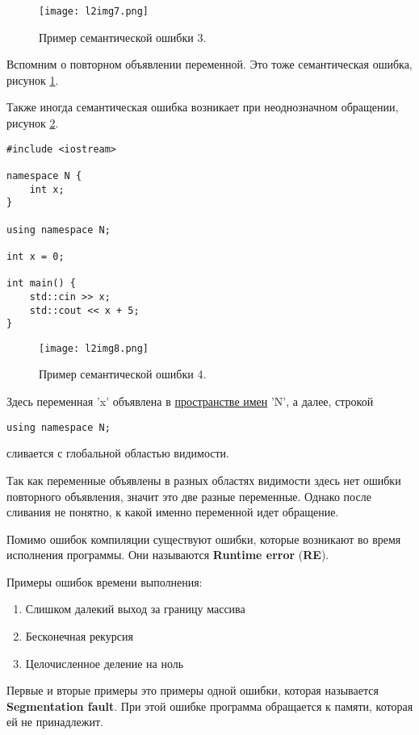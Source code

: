 \begin{figure}[h]
    \centering
    \texttt{[image: l2img7.png]}
    \caption{Пример семантической ошибки 3.}
    \label{l2img7}
\end{figure}

Вспомним о повторном объявлении переменной. Это тоже семантическая ошибка, рисунок \ref{l2img7}.

Также иногда семантическая ошибка возникает при неоднозначном обращении, рисунок \ref{l2img8}.

\begin{verbatim}
#include <iostream>

namespace N {
    int x;
}

using namespace N;

int x = 0;

int main() {
    std::cin >> x;
    std::cout << x + 5;
}
\end{verbatim}

\begin{figure}[h]
    \centering
    \texttt{[image: l2img8.png]}
    \caption{Пример семантической ошибки 4.}
    \label{l2img8}
\end{figure}

Здесь переменная 'x' объявлена в \underline{пространстве имен} 'N', а далее, строкой

\begin{verbatim}
using namespace N;
\end{verbatim}

сливается с глобальной областью видимости.

Так как переменные объявлены в разных областях видимости здесь нет ошибки повторного объявления,
значит это две разные переменные. Однако после сливания не понятно, к какой именно переменной идет обращение.


Помимо ошибок компиляции существуют ошибки, которые возникают во время исполнения программы.
Они называются \textbf{Runtime error} (\textbf{RE}).

Примеры ошибок времени выполнения:

\begin{enumerate}
    \item Слишком далекий выход за границу массива
    \item Бесконечная рекурсия
    \item Целочисленное деление на ноль
\end{enumerate}

Первые и вторые примеры это примеры одной ошибки, которая называется \textbf{Segmentation fault}.
При этой ошибке программа обращается к памяти, которая ей не принадлежит.


